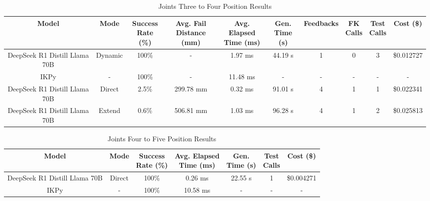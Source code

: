 \begin{landscape}
\begin{table}[H]
\tiny
\renewcommand{\arraystretch}{1.2}
\caption{Joints Three to Four Position Results}
\begin{center}
\begin{tabular}{|c|c|c|c|c|c|c|c|c|c|}
    \hline
    \textbf{Model} & 
    \textbf{Mode} & 
    \makecell{\textbf{Success}\\\textbf{Rate (\%)}} &
    \makecell{\textbf{Avg. Fail}\\\textbf{Distance (mm)}} &
    \makecell{\textbf{Avg. Elapsed}\\\textbf{Time (ms)}} &
    \makecell{\textbf{Gen.}\\\textbf{Time (s)}} &
    \textbf{Feedbacks} &
    \makecell{\textbf{FK}\\\textbf{Calls}} &
    \makecell{\textbf{Test}\\\textbf{Calls}} &
    \textbf{Cost (\$)} \\
    \hline
    DeepSeek R1 Distill Llama 70B & Dynamic & 100\% & - & 1.97 ms & 44.19 s & 1 & 0 & 3 & \$0.012727 \\
    \hline
    IKPy & - & 100\% & - & 11.48 ms & - & - & - & - & - \\
    \hline
    DeepSeek R1 Distill Llama 70B & Direct & 2.5\% & 299.78 mm & 0.32 ms & 91.01 s & 4 & 1 & 1 & \$0.022341 \\
    \hline
    DeepSeek R1 Distill Llama 70B & Extend & 0.6\% & 506.81 mm & 1.03 ms & 96.28 s & 4 & 1 & 2 & \$0.025813 \\
    \hline
\end{tabular}
\label{Results-Position-3-4}
\end{center}
\end{table}

\begin{table}[H]
\tiny
\renewcommand{\arraystretch}{1.2}
\caption{Joints Four to Five Position Results}
\begin{center}
\begin{tabular}{|c|c|c|c|c|c|c|}
    \hline
    \textbf{Model} & 
    \textbf{Mode} & 
    \makecell{\textbf{Success}\\\textbf{Rate (\%)}} &
    \makecell{\textbf{Avg. Elapsed}\\\textbf{Time (ms)}} &
    \makecell{\textbf{Gen.}\\\textbf{Time (s)}} &
    \makecell{\textbf{Test}\\\textbf{Calls}} &
    \textbf{Cost (\$)} \\
    \hline
    DeepSeek R1 Distill Llama 70B & Direct & 100\% & 0.26 ms & 22.55 s & 1 & \$0.004271 \\
    \hline
    IKPy & - & 100\% & 10.58 ms & - & - & - \\
    \hline
\end{tabular}
\label{Results-Position-4-5}
\end{center}
\end{table}


\end{landscape}
